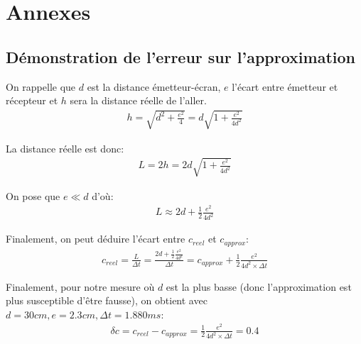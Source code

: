 \documentclass[12pt]{article}
\begin{document}
\break
\section*{Annexes}
\subsection*{Démonstration de l'erreur sur l'approximation}
On rappelle que $d$ est la distance émetteur-écran, $e$ l'écart entre émetteur et récepteur et $h$ sera la distance réelle de l'aller.
\begin{align}
	h = \sqrt{d^2 + \frac{e^2}{4}} = d\sqrt{1+ \frac{e^2}{4d^2}}
\end{align}

La distance réelle est donc:
\begin{align}
	L = 2h = 2d\sqrt{1 + \frac{e^2}{4d^2}}
\end{align}

On pose que $e \ll d$ d'où:
\begin{align}
	L \approx 2d + \frac{1}{2} \frac{e^2}{4d^2}
\end{align}

Finalement, on peut déduire l'écart entre $c_{reel}$ et $c_{approx}$:
\begin{align}
	c_{reel} = \frac{L}{\Delta t} = \frac{2d + \frac{1}{2}\frac{e^2}{4d^2}}{\Delta t} = c_{approx} + \frac{1}{2}\frac{e^2}{4d^2 \times \Delta t}
\end{align}

Finalement, pour notre mesure où $d$ est la plus basse (donc l'approximation est plus susceptible d'être fausse), on obtient avec $d=30cm, e=2.3cm, \Delta t = 1.880ms$:
\begin{align}
	\delta c = c_{reel} - c_{approx} = \frac{1}{2}\frac{e^2}{4d^2 \times \Delta t} = 0.4
\end{align}
	
\end{document}
